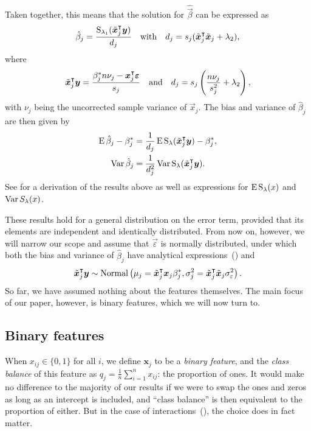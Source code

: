 Taken together, this means that the solution for \(\hat{\vec{\beta}}\) can be expressed as
\[
  \hat{\beta}_j = \frac{\operatorname{S}_{\lambda_1}(\tilde{\bm{x}}_j^\intercal \bm{y})}{d_j}\quad\text{with}\quad d_j = s_j(\tilde{\bm{x}}_j^\intercal \tilde{\bm{x}}_j + \lambda_2),
\]
where
\begin{equation}
  \label{eq:z-d}
  \tilde{\bm{x}}_j^\intercal \bm{y} = \frac{\beta_j^* n \nu_j- \bm{x}_j^\intercal \bm{\varepsilon}}{s_j}
  \quad\text{and}\quad
  d_j = s_j\left(\frac{n \nu_j}{s_j^2} + \lambda_2\right),
\end{equation}
with \(\nu_j\) being the uncorrected sample variance of \(\vec{x}_j\).
The bias and variance of \(\hat{\beta}_j\) are then given by
\begin{align}
  \operatorname{E} \hat\beta_j - \beta_j^* & = \frac{1}{d_j}\operatorname{E} \operatorname{S}_\lambda(\tilde{\bm{x}}_j^\intercal \bm{y}) - \beta^*_j,\label{eq:bias} \\
  \operatorname{Var} \hat\beta_j           & = \frac{1}{d_j^2} \operatorname{Var} \operatorname{S}_\lambda(\tilde{\bm{x}}_j^\intercal \bm{y}).\label{eq:variance}
\end{align}
See  for a derivation of the results above
as well as expressions for \(\operatorname{E} \operatorname{S}_\lambda(x)\) and \(\operatorname{Var} S_\lambda(x)\).

These results hold for a general distribution on the error term, provided that its elements
are independent and identically distributed. From now on, however, we will narrow our scope
and assume that \(\vec{\varepsilon}\) is normally distributed, under which both the bias
and variance of \(\hat{\beta}_j\) have analytical
expressions~() and
\[
  \tilde{\bm{x}}_j^\intercal \bm{y} \sim \operatorname{Normal}\left(\mu_j = \tilde{\bm{x}}_j^\intercal\bm{x}_j \beta_j^*, \sigma_j^2 = \tilde{\bm{x}}_j^\intercal\tilde{\bm{x}}_j \sigma_\varepsilon^2 \right).
\]
So far, we have assumed nothing about the features themselves. The main focus of our paper,
however, is binary features, which we will now turn to.

\subsection{Binary features}%
\label{sec:theory-binary-features}

When \(x_{ij} \in \{0, 1\}\) for all \(i\), we define \(\bm{x}_j\) to be a \emph{binary
  feature}, and the \emph{class balance} of this feature as \(q_j =
\frac{1}{n}\sum_{i=1}^n{x_{ij}}\): the proportion of ones. It would make no difference to
the majority of our results if we were to swap the ones and zeros as long as an intercept
is included, and ``class balance'' is then equivalent to the proportion of either. But in
the case of interactions~(), the choice does in fact matter.

